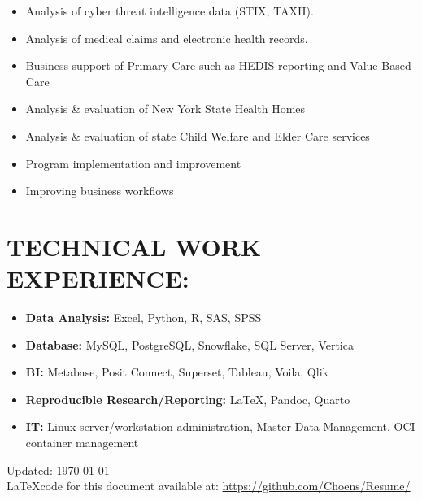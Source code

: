 \documentclass[line, mm, 10pt]{res}
\begin{document}
\begin{resume}
  \begin{itemize}
    \item Analysis of cyber threat intelligence data (STIX, TAXII).
    \item Analysis of medical claims and electronic health records.
    \item Business support of Primary Care such as HEDIS reporting and Value Based Care
    \item Analysis \& evaluation of New York State Health Homes
    \item Analysis \& evaluation of state Child Welfare and Elder Care services
    \item Program implementation and improvement
    \item Improving business workflows
  \end{itemize}

  \section{TECHNICAL WORK EXPERIENCE:}

  \begin{itemize}
    \item {\bf Data Analysis:} Excel, Python, R, SAS, SPSS
    \item {\bf Database:} MySQL, PostgreSQL, Snowflake, SQL Server, Vertica
    \item {\bf BI:} Metabase, Posit Connect, Superset, Tableau, Voila, Qlik 
    \item {\bf Reproducible Research/Reporting:} \LaTeX, Pandoc, Quarto
    \item {\bf IT:} Linux server/workstation administration, Master Data Management, OCI container management 
  \end{itemize}


\end{resume}

\vspace{.25in}
Updated: \today \\
\LaTeX code for this document available at:
\href{https://github.com/Choens/Resume/}{https://github.com/Choens/Resume/}
\end{document}
